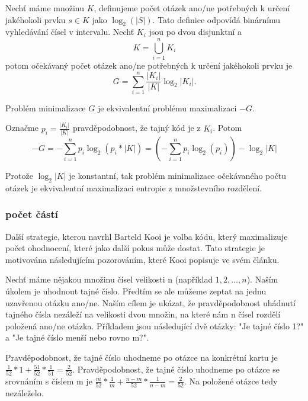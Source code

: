 Nechť máme množinu $K$, definujeme počet otázek ano/ne potřebných k určení jakéhokoli prvku $s \in K$ jako $\log_2(|S|)$. %
Tato definice odpovídá binárnímu vyhledávání čísel v intervalu. Nechť $K_i$ jsou po dvou disjunktní a 
\[K = \bigcup_{i =1}^n K_i \]
potom očekávaný počet otázek ano/ne potřebných k určení jakéhokoli prvku je 
\[G = \sum_{i =1}^n \frac{|K_i|}{|K|}\log_2|K_i|. \]

Problém minimalizace $G$ je ekvivalentní problému maximalizaci $-G$.

Označme $p_i = \frac{|K_i|}{|K|}$ pravděpodobnost, že tajný kód je z $K_i$. Potom 
\[-G = -\sum_{i =1}^n p_i\log_2(p_i * |K|) =  \left( -  \sum_{i =1}^n p_i\log_2(p_i) \right) - \log_2 |K|\]

Protože $\log_2 |K|$ je konstantní, tak problém minimalizace očekávaného počtu otázek je ekvivalentní maximalizaci entropie z množstevního rozdělení. 




\subsubsection{počet částí}
Další strategie, kterou navrhl Barteld Kooi \cite{kooi} je volba kódu, který maximalizuje počet ohodnocení, které jako další pokus může dostat. Tato strategie je motivována následujícím pozorováním, které Kooi popisuje ve svém článku. 

Nechť máme nějakou množinu čísel velikosti n (například $1,2,\dots, n$). Naším úkolem je uhodnout tajné číslo. Předtím se ale můžeme zeptat na jednu uzavřenou otázku ano/ne. Naším cílem je ukázat, že pravděpodobnost uhádnutí tajného čísla nezáleží na velikosti dvou množin, na které nám n čísel rozdělí položená ano/ne otázka. Příkladem jsou následující dvě otázky: "Je tajné číslo 1?" a "Je tajné číslo menší nebo rovno m?". 

Pravděpodobnost, že tajné číslo uhodneme po otázce na konkrétní kartu je $\frac{1}{52}*1 + \frac{51}{52}*\frac{1}{51} = \frac{2}{52}$. 
Pravděpodobnost, že tajné číslo uhodneme po otázce se srovnáním s číslem m je $\frac{m}{52}*\frac{1}{m} + \frac{n-m}{52}*\frac{1}{n-m} = \frac{2}{52}$. 
Na položené otázce tedy nezáleželo.

